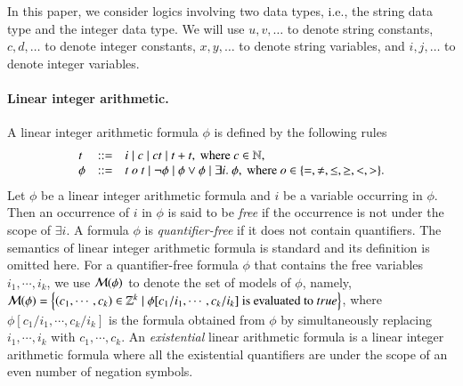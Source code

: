 
\medskip

In this paper, we consider logics involving two data types, i.e., the string data type and the integer data type. We will use $u, v, \dots$ to denote string constants,  $c, d,\dots$ to denote integer constants, $x, y, \dots$ to denote string variables, and $i, j, \dots$ to denote  integer variables.


\paragraph*{Linear integer arithmetic.}  A linear integer arithmetic formula $\phi$ is defined by the following rules
\[
\begin{array}{l c l}
t & ::=  & i \mid c \mid ct \mid t + t, \mbox{ where } c \in \mathbb{N}, \\
\phi &::= & t \ o \ t \mid \neg \phi \mid \phi \vee \phi \mid \exists i.\ \phi, \mbox{ where } o \in \{=, \neq, \le, \ge, <, >\}.
\end{array}
\]
Let $\phi$ be a linear integer arithmetic formula and $i$ be a variable occurring in $\phi$. Then an occurrence of $i$ in $\phi$ is said to be \emph{free}  if the occurrence is not under the scope of $\exists i$. A formula $\phi$ is \emph{quantifier-free} if it does not contain quantifiers. The semantics of linear integer arithmetic formula is standard and its definition is omitted here.
For a quantifier-free formula $\phi$ that contains the free variables $i_1, \cdots, i_k$, we use $\mathcal{M}(\phi)$ to denote the set of models of $\phi$, namely, $\mathcal{M}(\phi) = \left\{(c_1, \cdots ,c_k) \in \mathbb{Z}^k \mid \phi[c_1/i_1, \cdots, c_k/i_k] \mbox{ is evaluated to } true\right\}$, where $\phi[c_1/i_1, \cdots, c_k/i_k]$ is the formula obtained from $\phi$ by simultaneously replacing $i_1,\cdots, i_k$ with $c_1,\cdots, c_k$. An \emph{existential} linear arithmetic formula is a linear integer arithmetic formula where all the existential quantifiers are under the scope of an even number of negation symbols.
